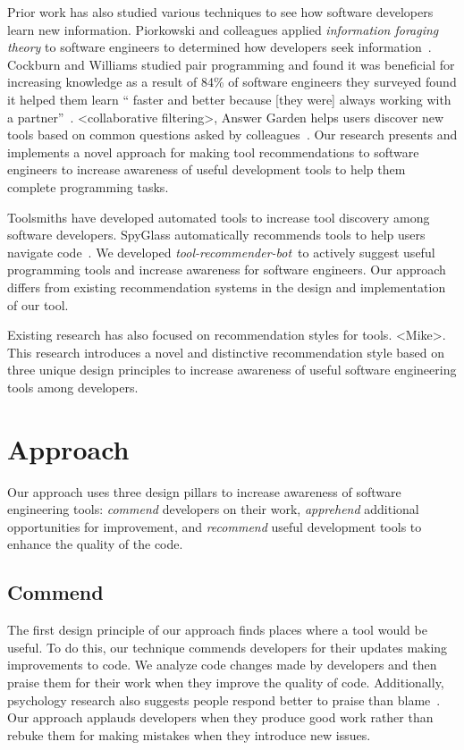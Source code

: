 \documentclass[sigconf,review,anonymous]{acmart}
\newcommand{\tool}{\textsl{tool-recommender-bot}}
\begin{document}
Prior work has also studied various techniques to see how software developers learn new information. Piorkowski and colleagues applied \textit{information foraging theory} to software engineers to determined how developers seek information~\cite{FlemingReactiveInformationForaging}. Cockburn and Williams studied pair programming and found it was beneficial for increasing knowledge as a result of 84\% of software engineers they surveyed found it helped them learn `` faster and better
because [they were] always working with a partner''~\cite{Cockburn2001PairProgramming}. <collaborative filtering>, Answer Garden helps users discover new tools based on common questions asked by colleagues~\cite{Ackerman1990AnswerGarden}. Our research presents and implements a novel approach for making tool recommendations to software engineers to increase awareness of useful development tools to help them complete programming tasks.

Toolsmiths have developed automated tools to increase tool discovery among software developers. SpyGlass automatically recommends tools to help users navigate code~\cite{Viriyakattiyaporn2010Spyglass}. We developed \tool~to actively suggest useful programming tools and increase awareness for software engineers. Our approach differs from existing recommendation systems in the design and implementation of our tool.

Existing research has also focused on recommendation styles for tools. <Mike>. This research introduces a novel and distinctive recommendation style based on three unique design principles to increase awareness of useful software engineering tools among developers.



\section{Approach}

Our approach uses three design pillars to increase awareness of software engineering tools: \textit{commend} developers on their work, \textit{apprehend} additional opportunities for improvement, and \textit{recommend} useful development tools to enhance the quality of the code.

\subsection{Commend}

The first design principle of our approach finds places where a tool would be useful. To do this, our technique commends developers for their updates making improvements to code. We analyze code changes made by developers and then praise them for their work when they improve the quality of code. Additionally, psychology research also suggests people respond better to praise than blame~\cite{PraiseAndBlame}. Our approach applauds developers when they produce good work rather than rebuke them for making mistakes when they introduce new issues. 
\end{document}
